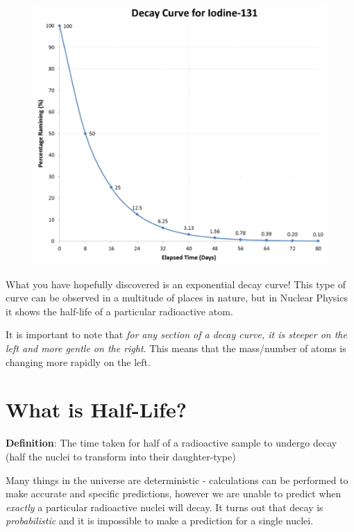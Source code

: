 \documentclass[12pt]{report}
\begin{document}
{\vspace{10cm}

\begin{figure}
	\centering
	\vspace{-1cm}
	\includegraphics[width=0.9\linewidth]{iodine-131.png}
\end{figure}

What you have hopefully discovered is an exponential decay curve! This type of curve can be observed in a multitude of places in nature, but in Nuclear Physics it shows the half-life of a particular radioactive atom.

It is important to note that \textit{for any section of a decay curve, it is steeper on the left and more gentle on the right}. This means that the mass/number of atoms is changing more rapidly on the left.

\section{What is Half-Life?}

\noindent\textbf{Definition}: The time taken for half of a radioactive sample to undergo decay (half the nuclei to transform into their daughter-type)

Many things in the universe are deterministic - calculations can be performed to make accurate and specific predictions, however we are unable to predict when \textit{exactly} a particular radioactive nuclei will decay. It turns out that decay is \textit{probabilistic} and it is impossible to make a prediction for a single nuclei.

}
\end{document}
